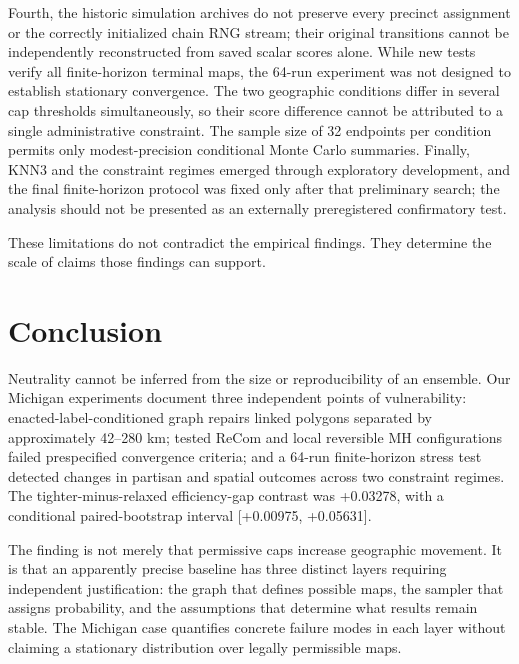 \documentclass[
  10pt,
]{article}
\begin{document}
Fourth, the historic simulation archives do not preserve every precinct
assignment or the correctly initialized chain RNG stream; their original
transitions cannot be independently reconstructed from saved scalar
scores alone. While new tests verify all finite-horizon terminal maps,
the 64-run experiment was not designed to establish stationary
convergence. The two geographic conditions differ in several cap
thresholds simultaneously, so their score difference cannot be
attributed to a single administrative constraint. The sample size of 32
endpoints per condition permits only modest-precision conditional Monte
Carlo summaries. Finally, KNN3 and the constraint regimes emerged
through exploratory development, and the final finite-horizon protocol
was fixed only after that preliminary search; the analysis should not be
presented as an externally preregistered confirmatory test.

These limitations do not contradict the empirical findings. They
determine the scale of claims those findings can support.

\hypertarget{conclusion}{%
\section{Conclusion}\label{conclusion}}

Neutrality cannot be inferred from the size or reproducibility of an
ensemble. Our Michigan experiments document three independent points of
vulnerability: enacted-label-conditioned graph repairs linked polygons
separated by approximately 42--280 km; tested ReCom and local reversible
MH configurations failed prespecified convergence criteria; and a 64-run
finite-horizon stress test detected changes in partisan and spatial
outcomes across two constraint regimes. The tighter-minus-relaxed
efficiency-gap contrast was +0.03278, with a conditional
paired-bootstrap interval {[}+0.00975, +0.05631{]}.

The finding is not merely that permissive caps increase geographic
movement. It is that an apparently precise baseline has three distinct
layers requiring independent justification: the graph that defines
possible maps, the sampler that assigns probability, and the assumptions
that determine what results remain stable. The Michigan case quantifies
concrete failure modes in each layer without claiming a stationary
distribution over legally permissible maps.
\end{document}
